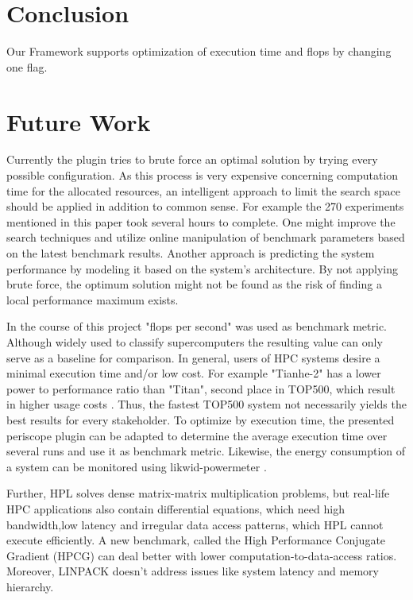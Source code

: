\documentclass[10pt,twocolumn]{article}
\begin{document}
\section{Conclusion}
\label{sec:conclusion}
Our Framework supports optimization of execution time and flops by changing one flag.


\section{Future Work}
\label{sec:futureWork}

Currently the plugin tries to brute force an optimal solution by trying every possible configuration. As this process is very expensive concerning computation time for the allocated resources, an intelligent approach to limit the search space should be applied in addition to common sense. For example the 270 experiments mentioned in this paper took several hours to complete. One might improve the search techniques and utilize online manipulation of benchmark parameters based on the latest benchmark results. Another approach is predicting the system performance by modeling it based on the system's architecture. By not applying brute force, the optimum solution might not be found as the risk of finding a local performance maximum exists.

In the course of this project "flops per second" was used as benchmark metric. Although widely used to classify supercomputers the resulting value can only serve as a baseline for comparison. In general, users of HPC systems desire a minimal execution time and/or low cost. For example "Tianhe-2" has a lower power to performance ratio than "Titan", second place in TOP500, which result in higher usage costs \cite{top500}. Thus, the fastest TOP500 system not necessarily yields the best results for every stakeholder. To optimize by execution time, the presented periscope plugin can be adapted to determine the average execution time over several runs and use it as benchmark metric. Likewise, the energy consumption of a system can be monitored using likwid-powermeter \cite{likwidLRZ,likwidPowermeter}.

Further, HPL solves dense matrix-matrix multiplication problems, but real-life HPC applications also contain differential equations, which need high bandwidth,low latency and irregular data access patterns, which HPL cannot execute efficiently. A new benchmark, called the High Performance Conjugate Gradient (HPCG) can deal better with lower computation-to-data-access ratios\cite{betterLinpack}. Moreover, LINPACK doesn't address issues like system latency and memory hierarchy. 
\end{document}
